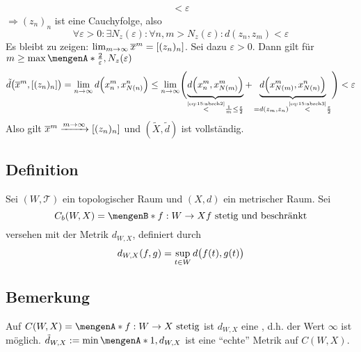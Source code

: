 \begin{description}
\begin{description}
\begin{align*}
		< \varepsilon
	\end{align*}
	$\Rightarrow (z_n)_n$ ist eine Cauchyfolge, also 
	\begin{equation*}
		\forall \varepsilon>0 : \exists N_z(\varepsilon) : \forall n,m > N_z(\varepsilon)  : d(z_n,z_m) < \varepsilon  \label{eq:15:absch3} \tag{\#}
	\end{equation*}
	Es bleibt zu zeigen: $\lim_{m \to \infty} \overline{x}^m = \benbrace*{(z_n)_n}$. Sei dazu $\varepsilon>0$. Dann gilt für 
	$m \ge \max \set{\frac{2}{\varepsilon}, N_z(\varepsilon)}$
	\begin{align*}
		\tilde{d} \enbrace[\big]{\overline{x}^m, \benbrace*{(z_n)_n}} = \lim_{ n \to \infty} d \enbrace*{x^m_n, x^n_{N(n)}}\le \lim_{ n \to \infty} 
		\enbrace[\Bigg]{ \underbrace{d\enbrace*{x_n^m, x^m_{N(m)}}}_{\stackrel{\text{\eqref{eq:15:absch2}}}{<} \frac{1}{m} \le \frac{\varepsilon}{2}  } +
		\underbrace{d\enbrace*{x^m_{N(m)}, x^n_{N(n)}}}_{=d(z_m,z_n) \stackrel{\text{\eqref{eq:15:absch3}}}{<} \frac{\varepsilon}{2} } } < \varepsilon
	\end{align*}
	Also gilt $\overline{x}^m \xrightarrow{m \to \infty} \benbrace*{(z_n)_n}$ und $(\tilde{X},\tilde{d})$ ist vollständig. \bewende
	\end{description}
\end{description}

\subsection[Definition: Raum der beschränkten, stetigen Abbildungen]{Definition} %
\label{sub:16}
Sei $(W,\mathcal{T})$ ein topologischer Raum und $(X,d)$ ein metrischer Raum. Sei 
\[
	C_b(W,X) = \set[f : W \to X]{f \text{ stetig und beschränkt}} 
\]
versehen mit der Metrik $d_{W,X}$, definiert durch
\[
	d_{W,X}(f,g) = \sup_{t \in W} d \enbrace[\big]{f(t), g(t)} 
\]

\subsection[Bemerkung: $d_{W,X}$ als Metrik auf $C(W,X)$]{Bemerkung} %
\label{sub:17}
Auf $C(W,X) = \set{f : W \to X \text{ stetig}} $ ist $d_{W,X}$ eine , d.h. der Wert $\infty$ ist möglich.
$\tilde{d}_{W,X} := \min \set{1, d_{W,X}} $ ist eine \enquote{echte} Metrik auf $C(W,X)$.

